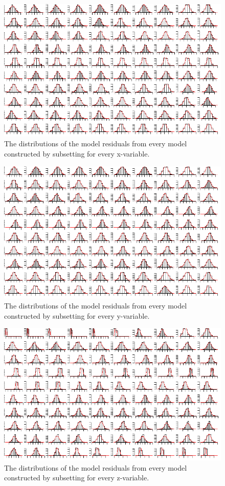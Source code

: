 \documentclass[11pt, fleqn, titlepage]{article}
\begin{document}
\begin{figure}
	\centering
	\includegraphics[width=0.9\linewidth]{billeder/residu1}
	\caption{The distributions of the model residuals from every model constructed by subsetting for every x-variable.}
	\label{fig:residu1}
\end{figure}

\begin{figure}
	\centering
	\includegraphics[width=0.9\linewidth]{billeder/residu2}
	\caption{The distributions of the model residuals from every model constructed by subsetting for every y-variable.}
	\label{fig:residu2}
\end{figure}
	
\begin{figure}
	\centering
	\includegraphics[width=0.9\linewidth]{billeder/residu3}
	\caption{The distributions of the model residuals from every model constructed by subsetting for every z-variable.}
	\label{fig:residu3}
\end{figure}	
	


\end{document}
